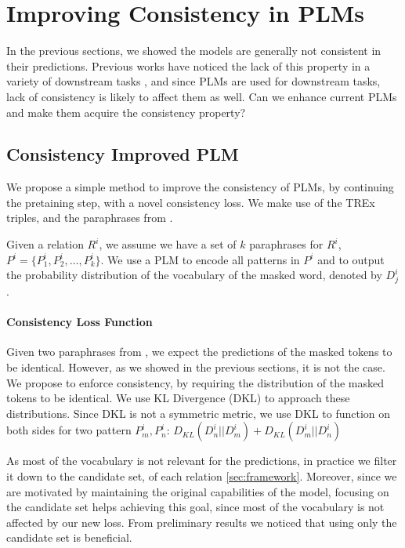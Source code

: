\section{Improving Consistency in PLMs}
\label{sec:adding_consistency}

In the previous sections, we showed the models are generally not consistent in their predictions. Previous works have noticed the lack of this property in a variety of downstream tasks \cite{}, and since PLMs are used for downstream tasks, lack of consistency is likely to affect them as well.
Can we enhance current PLMs and make them acquire the consistency property?

\subsection{Consistency Improved PLM}
We propose a simple method to improve the consistency of PLMs, by continuing the pretaining step, with a novel consistency loss. 
We make use of the TREx triples, and the paraphrases from \resource{}.

Given a relation $R^i$, we
assume we have a set of $k$ paraphrases for $R^i$,
$P^i=\{P_1^i, P_2^i, \dots, P_k^i\}$.
We use a PLM to encode all patterns in $P^i$ and to output the probability distribution of the vocabulary of the masked word, denoted by $D^i_j$.


\paragraph{Consistency Loss Function}
Given two paraphrases from \resource{}, we expect the predictions of the masked tokens to be identical. However, as we showed in the previous sections, it is not the case. 
We propose to enforce consistency, by requiring the distribution of the masked tokens to be identical. We use KL Divergence (DKL) to approach these distributions. Since DKL is not a symmetric metric, we use DKL to function on both sides for two pattern $P^i_m,P^i_n$:
$D_{KL}(D^i_n||D^i_m) + D_{KL} (D^i_m||D^i_n)$

As most of the vocabulary is not relevant for the
predictions, in practice we filter it down to the candidate set, of each relation \ref{sec:framework}. Moreover, since we are motivated by maintaining the original capabilities of the model, focusing on the candidate set helps achieving this goal, since most of the vocabulary is not affected by our new loss.
From preliminary results we noticed that using only the candidate set is beneficial.


